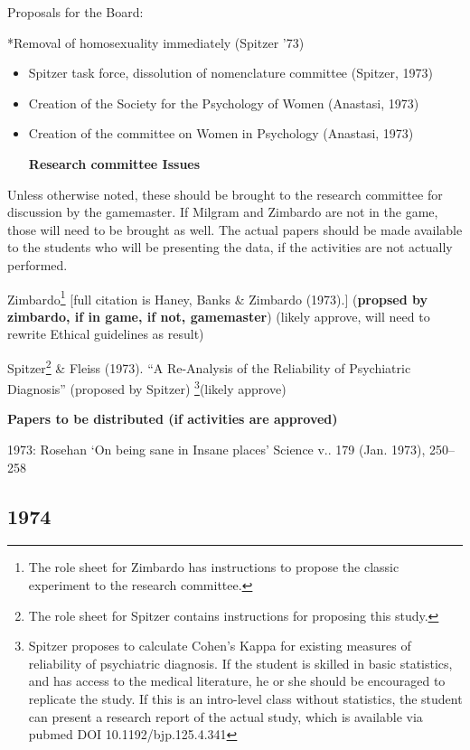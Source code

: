 \begin{refsection}
Proposals for the Board:

*Removal of homosexuality immediately (Spitzer '73)

\begin{itemize}
\item Spitzer task force, dissolution of nomenclature committee (Spitzer, 1973)

\item Creation of the Society for the Psychology of Women (Anastasi, 1973)

\item Creation of the committee on Women in Psychology (Anastasi, 1973)

\textbf{Research committee Issues}

\end{itemize}

Unless otherwise noted, these should be brought to the research committee for discussion by the gamemaster. If Milgram and Zimbardo are not in the game, those will need to be brought as well. The actual papers should be made available to the students who will be presenting the data, if the activities are not actually performed.

Zimbardo\footnote{The role sheet for Zimbardo has instructions to propose the classic experiment to the research committee.} [full citation is Haney, Banks \& Zimbardo (1973).] (\textbf{propsed by zimbardo, if in game, if not, gamemaster}) (likely approve, will need to rewrite Ethical guidelines as result) 

Spitzer\footnote{The role sheet for Spitzer contains instructions for proposing this study.} \& Fleiss (1973). ``A Re-Analysis of the Reliability of Psychiatric Diagnosis'' (proposed by Spitzer) \footnote{Spitzer proposes to calculate Cohen's Kappa for existing measures of reliability of psychiatric diagnosis. If the student is skilled in basic statistics, and has access to the medical literature, he or she should be encouraged to replicate the study. If this is an intro-level class without statistics, the student can present a research report of the actual study, which is available via pubmed DOI 10.1192\slash bjp.125.4.341}(likely approve)

\textbf{Papers to be distributed (if activities are approved)}

1973: Rosehan `On being sane in Insane places' Science v.. 179 (Jan. 1973), 250--258

\newpage

\subsection{1974}
\label{1974}


\end{refsection}
